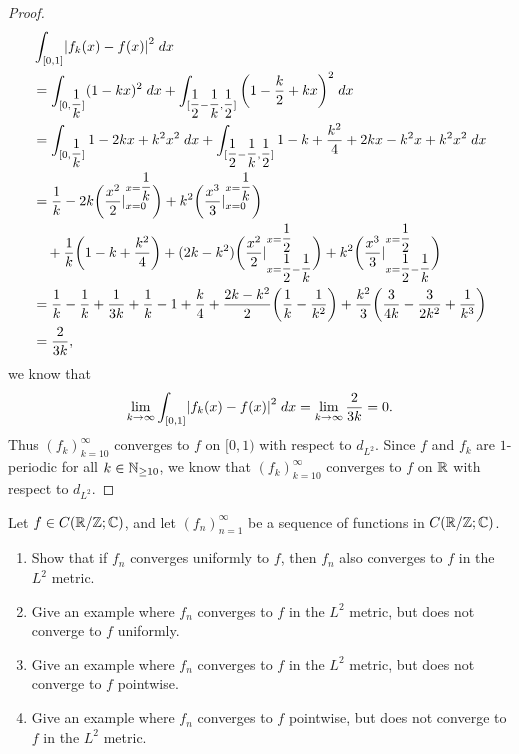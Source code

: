 \begin{proof}
\begin{align*}
     & \int_{[0, 1]} \abs{f_k(x) - f(x)}^2 \; dx                                                                                                                                                                                                    \\
     & = \int_{[0, \dfrac{1}{k}]} (1 - kx)^2 \; dx + \int_{[\dfrac{1}{2} - \dfrac{1}{k}, \dfrac{1}{2}]} \bigg(1 - \dfrac{k}{2} + kx\bigg)^2 \; dx                                                                                                   \\
     & = \int_{[0, \dfrac{1}{k}]} 1 - 2kx + k^2 x^2 \; dx + \int_{[\dfrac{1}{2} - \dfrac{1}{k}, \dfrac{1}{2}]} 1 - k + \dfrac{k^2}{4} + 2kx - k^2 x + k^2 x^2 \; dx                                                                                 \\
     & = \dfrac{1}{k} - 2k \bigg(\dfrac{x^2}{2}|_{x = 0}^{x = \dfrac{1}{k}}\bigg) + k^2 \bigg(\dfrac{x^3}{3}|_{x = 0}^{x = \dfrac{1}{k}}\bigg)                                                                                                      \\
     & \quad + \dfrac{1}{k} \bigg(1 - k + \dfrac{k^2}{4}\bigg) + (2k - k^2) \bigg(\dfrac{x^2}{2}|_{x = \dfrac{1}{2} - \dfrac{1}{k}}^{x = \dfrac{1}{2}}\bigg) + k^2 \bigg(\dfrac{x^3}{3}|_{x = \dfrac{1}{2} - \dfrac{1}{k}}^{x = \dfrac{1}{2}}\bigg) \\
     & = \dfrac{1}{k} - \dfrac{1}{k} + \dfrac{1}{3k} + \dfrac{1}{k} - 1 + \dfrac{k}{4} + \dfrac{2k - k^2}{2} \bigg(\dfrac{1}{k} - \dfrac{1}{k^2}\bigg) + \dfrac{k^2}{3} \bigg(\dfrac{3}{4k} - \dfrac{3}{2k^2} + \dfrac{1}{k^3}\bigg)                \\
     & = \dfrac{2}{3k},
  \end{align*}
  we know that
  \[
    \lim_{k \to \infty} \int_{[0, 1]} \abs{f_k(x) - f(x)}^2 \; dx = \lim_{k \to \infty} \dfrac{2}{3k} = 0.
  \]
  Thus \((f_k)_{k = 10}^\infty\) converges to \(f\) on \([0, 1)\) with respect to \(d_{L^2}\).
  Since \(f\) and \(f_k\) are \(1\)-periodic for all \(k \in \mathbb{N}_{\geq 10}\), we know that \((f_k)_{k = 10}^\infty\) converges to \(f\) on \(\mathbb{R}\) with respect to \(d_{L^2}\).
\end{proof}

\begin{ex}\label{ii:ex:5.2.6}
  Let \(f \in C(\mathbb{R} / \mathbb{Z} ; \mathbb{C})\), and let \((f_n)_{n = 1}^\infty\) be a sequence of functions in \(C(\mathbb{R} / \mathbb{Z} ; \mathbb{C})\).
  \begin{enumerate}
    \item Show that if \(f_n\) converges uniformly to \(f\), then \(f_n\) also converges to \(f\) in the \(L^2\) metric.
    \item Give an example where \(f_n\) converges to \(f\) in the \(L^2\) metric, but does not converge to \(f\) uniformly.
    \item Give an example where \(f_n\) converges to \(f\) in the \(L^2\) metric, but does not converge to \(f\) pointwise.
    \item Give an example where \(f_n\) converges to \(f\) pointwise, but does not converge to \(f\) in the \(L^2\) metric.
  \end{enumerate}
\end{ex}

